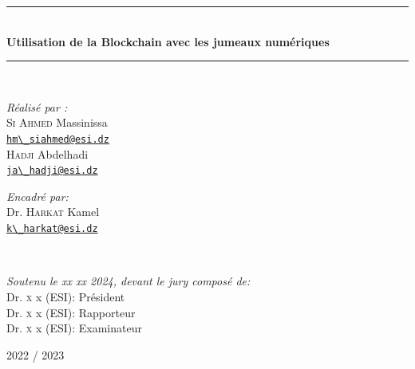 {\begin{titlepage}
    \rule{\linewidth}{0.3mm} \\[0.4cm]
    {
    \Large \bfseries
    Utilisation de la Blockchain avec les jumeaux numériques\\
    }
    \rule{\linewidth}{0.3mm} \\[1cm]

    \vspace{10mm}

    \noindent
    \begin{minipage}{0.6\textwidth}
      \vspace{-7mm}
      \begin{flushleft} \large
        \emph{Réalisé par :}\\
        {
        \textsc{Si Ahmed} Massinissa\\
        \href{mailto:hm_siahmed@esi.dz}{\verb!hm\_siahmed@esi.dz!}\\
        \textsc{Hadji} Abdelhadi\\
        \href{mailto:ja_hadji@esi.dz}{\verb!ja\_hadji@esi.dz!}
        }
      \end{flushleft}
    \end{minipage}
    \begin{minipage}{0.35\textwidth}
      \begin{flushright} \large
        \begin{flushleft} \large
          \emph{Encadré par:} \\
          {
          Dr. \textsc{Harkat} Kamel\\[0.1cm]
          \href{mailto:k_harkat@esi.dz}{\verb!k\_harkat@esi.dz!}\\
          }
        \end{flushleft}
      \end{flushright}
    \end{minipage}\\[1cm]

    \begin{minipage}{.7\linewidth}
      \begin{center}
        \begin{flushleft}
          \emph{Soutenu le xx xx 2024, devant le jury composé de:}\\
          Dr. \textsc{x} x (ESI): Président\\
          Dr. \textsc{x} x (ESI): Rapporteur\\
          Dr. \textsc{x} x (ESI): Examinateur\\
        \end{flushleft}
      \end{center}
    \end{minipage}

    \vfill

    {\large 2022 / 2023}
  \end{titlepage}
  \restoregeometry
}